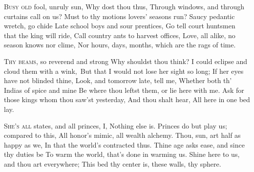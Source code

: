\documentclass[fontsize=9, a5paper]{scrbook}
\newcommand\blankpage{%
    \null
    \thispagestyle{empty}%
    \addtocounter{page}{-1}%
    \newpage}
\begin{document}
\afterpage{\blankpage}
\begin{poem}
	\begin{stanza}
		               \verseindent\verseindent \textsc{Busy old} fool, unruly sun,\verseline
		               \verseindent\verseindent Why dost thou thus,\verseline
		Through windows, and through curtains call on us?\verseline
		Must to thy motions lovers' seasons run?\verseline
		               \verseindent\verseindent Saucy pedantic wretch, go chide\verseline
		               \verseindent\verseindent Late school boys and sour prentices,\verseline
		         \verseindent Go tell court huntsmen that the king will ride,\verseline
		         \verseindent Call country ants to harvest offices,\verseline
		Love, all alike, no season knows nor clime,\verseline
		Nor hours, days, months, which are the rags of time.
	\end{stanza}
	
	\begin{stanza}
		               \verseindent\verseindent \textsc{Thy beams,} so reverend and strong\verseline
		               \verseindent\verseindent Why shouldst thou think?\verseline
		I could eclipse and cloud them with a wink,\verseline\
		But that I would not lose her sight so long;\verseline
		               \verseindent\verseindent If her eyes have not blinded thine,\verseline
		               \verseindent\verseindent Look, and tomorrow late, tell me,\verseline
		         \verseindent Whether both th' Indias of spice and mine\verseline
		         \verseindent Be where thou leftst them, or lie here with me.\verseline
		Ask for those kings whom thou saw'st yesterday,\verseline
		And thou shalt hear, All here in one bed lay.
	\end{stanza}
		
	\begin{stanza}
		               \verseindent\verseindent \textsc{She's all} states, and all princes, I,\verseline
		               \verseindent\verseindent Nothing else is.\verseline
		Princes do but play us; compared to this,\verseline
		All honor's mimic, all wealth alchemy.\verseline
		               \verseindent\verseindent Thou, sun, art half as happy as we,\verseline
		               \verseindent\verseindent In that the world's contracted thus.\verseline
		         \verseindent Thine age asks ease, and since thy duties be\verseline
		         \verseindent To warm the world, that's done in warming us.\verseline
		Shine here to us, and thou art everywhere;\verseline
		This bed thy center is, these walls, thy sphere.
	\end{stanza}
\end{poem}
\end{document}
